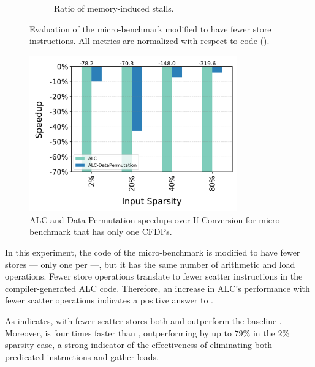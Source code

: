 \begin{figure}[htbp]
\begin{subfigure}{.5\textwidth}
    \caption{Ratio of memory-induced stalls.}
    \label{fig:if-then-else-few-scatter-mem-stalls}
  \end{subfigure}%
  \caption{Evaluation of the \ifElseBench micro-benchmark modified to have fewer store instructions. All metrics are normalized with respect to \ifconverted code (\ifconv).}
\end{figure}


\begin{figure}[h!]
  \includegraphics[width=0.8\textwidth]{Figures/Evaluations/single_if_many_scatter_speedup.png}
  \caption{ALC and Data Permutation speedups over If-Conversion for \ifThenBench micro-benchmark that has only one CFDPs.}
  \label{fig:single-if-many-scatter-speedup}
\end{figure}

In this experiment, the code of the \ifElseBench micro-benchmark is modified to have fewer stores --- only one per \cpath ---, but it has the same number of arithmetic and load operations.
Fewer store operations translate to fewer scatter instructions in the compiler-generated ALC code.
Therefore, an increase in ALC's performance with fewer scatter operations indicates a positive answer to .

As  indicates, with fewer scatter stores both \ALC and \ALCdp outperform the baseline \ifconv.
Moreover, \ALCdp is four times faster than \ALC, outperforming \ifconv by up to $79\%$ in the $2\%$ sparsity case, a strong indicator of the effectiveness of eliminating both predicated instructions and gather loads.


